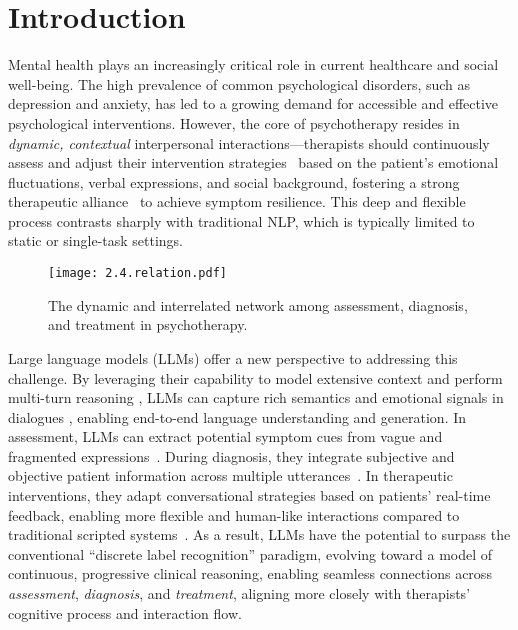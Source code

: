 \section{Introduction}

Mental health plays an increasingly critical role in current healthcare and social well-being.
The high prevalence of common psychological disorders, such as depression and anxiety, has led to a growing demand for accessible and effective psychological interventions. However, the core of psychotherapy resides in \textit{dynamic, contextual} interpersonal interactions—therapists should continuously assess and adjust their intervention strategies~\cite{wampold2015great} based on the patient’s emotional fluctuations, verbal expressions, and social background, fostering a strong therapeutic alliance~\cite{stubbe2018therapeutic} to achieve symptom resilience. This deep and flexible process contrasts sharply with traditional NLP, which is typically limited to static or single-task settings.

\begin{figure}[t!]
\centering
\texttt{[image: 2.4.relation.pdf]}
\caption{The dynamic and interrelated network among assessment, diagnosis, and treatment in psychotherapy.}
\vspace{-4mm}
\label{fig:Taxonomy}
\end{figure}

Large language models (LLMs) offer a new perspective to addressing this challenge. By leveraging their capability to model extensive context and perform multi-turn reasoning \cite{wang-etal-2024-document-level,NEURIPS2024_e560a0b2}, LLMs can capture rich semantics and emotional signals in dialogues \cite{ma-etal-2025-detecting}, enabling end-to-end language understanding and generation.
In assessment, LLMs can extract potential symptom cues from vague and fragmented expressions~\cite{24,108}. During diagnosis, they integrate subjective and objective patient information across multiple utterances~\cite{9,52}. In therapeutic interventions, they adapt conversational strategies based on patients' real-time feedback, enabling more flexible and human-like interactions compared to traditional scripted systems~\cite{40,78}. As a result, LLMs have the potential to surpass the conventional ``discrete label recognition'' paradigm, evolving toward a model of continuous, progressive clinical reasoning, enabling seamless connections across \textit{assessment}, \textit{diagnosis}, and \textit{treatment}, aligning more closely with therapists' cognitive process and interaction flow.


